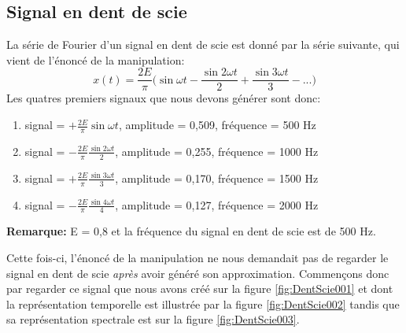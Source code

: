 \documentclass[a4paper]{article}
\begin{document}










\subsection{Signal en dent de scie}





La série de Fourier d'un signal en dent de scie est donné par la série suivante, qui vient de l'énoncé de la manipulation:
\[ x(t) = \frac{2E}{\pi} \bigg( \sin \omega t - \frac{\sin 2 \omega t}{2} + \frac{\sin 3 \omega t}{3} - ... \bigg) \]
Les quatres premiers signaux que nous devons générer sont donc:
\begin{enumerate}
    \item signal = $\displaystyle +\frac{2E}{\pi} \sin \omega t $, amplitude = 0,509, fréquence = 500 Hz
    \item signal = $\displaystyle -\frac{2E}{\pi} \frac{\sin 2 \omega t}{2} $, amplitude = 0,255, fréquence = 1000 Hz
    \item signal = $\displaystyle +\frac{2E}{\pi} \frac{\sin 3 \omega t}{3} $, amplitude = 0,170, fréquence = 1500 Hz
    \item signal = $\displaystyle -\frac{2E}{\pi} \frac{\sin 4 \omega t}{4} $, amplitude = 0,127, fréquence = 2000 Hz
\end{enumerate}
\textbf{Remarque:} E = 0,8 et la fréquence du signal en dent de scie est de 500 Hz.






Cette fois-ci, l'énoncé de la manipulation ne nous demandait pas de regarder le signal en dent de scie \textit{après} avoir généré son approximation. Commençons donc par regarder ce signal que nous avons créé sur la figure \ref{fig:DentScie001} et dont la représentation temporelle est illustrée par la figure \ref{fig:DentScie002} tandis que sa représentation spectrale est sur la figure \ref{fig:DentScie003}.

\end{document}
